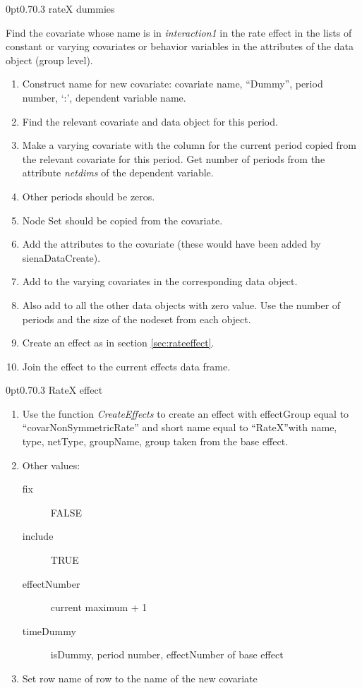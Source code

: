 \documentclass[12pt,a4paper]{article}
\makeatletter
\renewcommand{\=}{\,=\,}
\newcommand{\+}{\,+\,}
\newcommand{\nnm}[1]{\textsf{\small\textit{#1}}}
\renewcommand{\subsection}{\@startsection{subsection}{2}
                {0pt}{0.7\baselineskip}{0.3\baselineskip}
                {\sffamily} }
\makeatother
\begin{document}
\subsection{rateX dummies}
\label{sec:ratex}
\begin{algorithmic}
\STATE Find the covariate whose name is in \nnm{interaction1}
 in the rate effect in the lists of constant or varying covariates or
behavior variables in the attributes of the data object (group level).
\STATE
\begin{enumerate}
\item Construct name for new covariate:
 covariate name, ``Dummy'', period number, `:', dependent variable name.
\item Find the relevant covariate and data object for this period.
\item Make a varying covariate with the column for the current period copied
from the relevant covariate for this period. Get number of periods from the
attribute \nnm{netdims} of the dependent variable.
\item Other periods should be zeros.
\item Node Set should be copied from the covariate.
\item Add the attributes to the covariate (these would have been added by
sienaDataCreate).
\item Add to the varying covariates in the corresponding data object.
\item Also add to all the other data objects with zero value. Use the number
  of periods and the size of the nodeset from each object.
\item Create an effect as in section \ref{sec:rateeffect}.
\item Join the effect to the current effects data frame.
\end{enumerate}
\ENDFOR
\ENDFOR
\end{algorithmic}
\subsection{RateX effect}
\label{sec:rateeffect}
\begin{enumerate}
\item Use the function \nnm{CreateEffects} to create an effect with effectGroup
  equal to ``covarNonSymmetricRate'' and short name equal to ``RateX''with name,
  type, netType, groupName, group taken from the base effect.
\item Other values: \begin{description}
\item[fix] FALSE
\item[include] TRUE
\item[effectNumber] current maximum + 1
\item[timeDummy] isDummy, period number, effectNumber of base effect
\end{description}
\item Set row name of row to the name of the new covariate
\end{enumerate}
\end{document}
